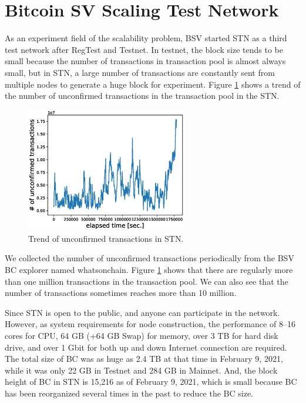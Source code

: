 \documentclass[graybox]{svmult}
\begin{document}
\section{Bitcoin SV Scaling Test Network}
\label{sec:stn}

As an experiment field of the scalability problem, BSV started STN as a third test network after RegTest and Testnet. 
In testnet, the block size tends to be small because the number of transactions in transaction pool is almost always small, but in STN, a large number of transactions are constantly sent from multiple nodes to generate a huge block for experiment. 
Figure \ref{fig:unconfirmed_tx} shows a trend of the number of unconfirmed transactions in the transaction pool in the STN. 
%
\begin{figure}[t]
  \vspace{-35mm}
  \begin{center}
    \includegraphics[width=70mm]{time_vs_tx-plot.eps}
  \end{center}
  \vspace{35mm}
  \caption{Trend of unconfirmed transactions in STN.}
  \label{fig:unconfirmed_tx}
\end{figure}
%
We collected the number of unconfirmed transactions periodically from the BSV BC explorer named whatsonchain\cite{woc}.
Figure \ref{fig:unconfirmed_tx} shows that there are regularly more than one million transactions in the transaction pool. 
We can also see that the number of transactions sometimes reaches more than 10 million.


Since STN is open to the public, and anyone can participate in the network. 
However, as system requirements for node construction, the performance of 8--16 cores for CPU, 64 GB (+64 GB Swap) for memory, over 3 TB for hard disk drive, and over 1 Gbit for both up and down Internet connection are required.
The total size of BC was as huge as 2.4 TB at that time in February 9, 2021, while it was only 22 GB in Testnet and 284 GB in Mainnet. 
And, the block height of BC in STN is 15,216 as of February 9, 2021, which is small because BC has been reorganized several times in the past to reduce the BC size. 
\end{document}
